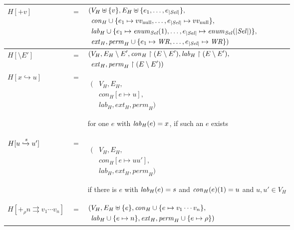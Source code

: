 	\begin{center}
		\begin{tabular}{lcl}
			$H[+v]$ & $=$ &
				$\begin{aligned}
					(&V_{H}\uplus\{v\},
					E_{H}\uplus\{e_{1},\dots,e_{|\mathit{Sel}|}\},\\
					&\mathit{con}_{H}\cup\{e_{1}\mapsto vv_{\text{null}},\dots,
					e_{|\mathit{Sel}|}\mapsto vv_{\text{null}}\},\\
					&\mathit{lab}_{H}\cup\{e_1\mapsto\mathit{enum}_{\mathit{Sel}}(1),\dots,
					e_{|\mathit{Sel}|}\mapsto\mathit{enum}_{\mathit{Sel}}
					(|\mathit{Sel}|)\},\\
					&\mathit{ext}_{H},
					\mathit{perm}_{H}\cup\{e_{1}\mapsto\mathit{WR},\dots,
					e_{|\mathit{Sel}|}\mapsto\mathit{WR}\})\\
				\end{aligned}$\\
			\hline
			$H[\setminus E']$ & $=$ &
				$\begin{aligned}
					(&V_H,E_H\setminus E',
					 \mathit{con}_H\upharpoonright (E\setminus E'),
					 \mathit{lab}_H\upharpoonright (E\setminus E'),\\
					 &\mathit{ext}_H,
					 \mathit{perm}_H\upharpoonright (E\setminus E'))
				\end{aligned}$\\
			\hline
				$H[x\hookrightarrow u]$ & $=$ &
				\begin{minipage}{4.5cm}
					$\begin{aligned}
						(&V_{H},E_{H},\\
						 &\mathit{con}_{H}[e\mapsto u],\\
						 &\mathit{lab}_{H},\mathit{ext}_{H},\mathit{perm}_{H})
					\end{aligned}$
				\end{minipage}%
				\begin{minipage}{5cm}
					for one $e$ with $\mathit{lab}_{H}(e) = x$, if such an $e$ exists
				\end{minipage}\\
			\hline
				$H[u\xhookrightarrow{s} u']$ & $=$ &
				\begin{minipage}{4.5cm}
					$\begin{aligned}
						(&V_H,E_H,\\
						 &\mathit{con}_H[e\mapsto uu'],\\
						 &\mathit{lab}_H,\mathit{ext}_H,\mathit{perm}_H)
					\end{aligned}$
				\end{minipage}%
				\begin{minipage}{5cm}
					if there is $e$ with $\mathit{lab}_{H}(e) = s$ and $\mathit{con}_{H}(e)(1) = u$
					and $u,u'\in V_{H}$
				\end{minipage}
			\\
			\hline
			$H[+_{\rho}n\rightrightarrows v_1\cdots v_n]$ & $=$ &
			$\begin{aligned}
				(&V_H,E_H\uplus\{e\},
				 \mathit{con}_H\cup\{e\mapsto v_1\cdots v_n\},\\
				 &\mathit{lab}_H\cup\{e\mapsto n\},
				 \mathit{ext}_H,
				 \mathit{perm}_H\cup\{e\mapsto\rho\})
			\end{aligned}$\\
		\end{tabular}
	\end{center}
